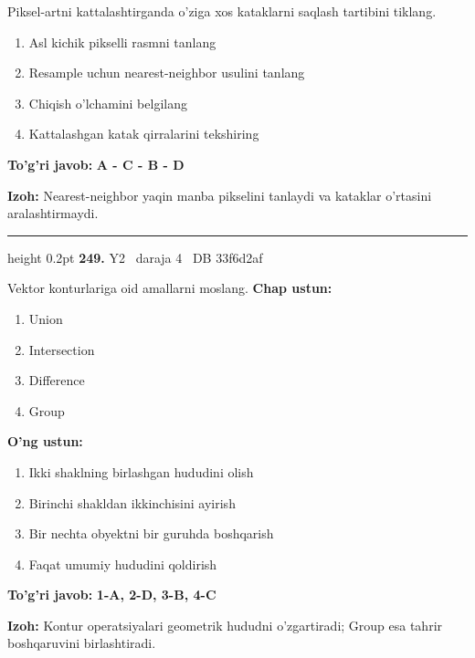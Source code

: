 \documentclass[10pt,a4paper,oneside]{article}
\begin{document}
Piksel-artni kattalashtirganda o'ziga xos kataklarni saqlash tartibini tiklang.
\begin{enumerate}[label=\Alph*),leftmargin=9mm]
\item Asl kichik pikselli rasmni tanlang
\item Resample uchun nearest-neighbor usulini tanlang
\item Chiqish o'lchamini belgilang
\item Kattalashgan katak qirralarini tekshiring
\end{enumerate}
\begin{tcolorbox}[enhanced,breakable,colback=teal!4,colframe=teal!45!black,boxrule=0.45pt,arc=1.2mm,left=2.8mm,right=2.8mm,top=2mm,bottom=2mm,before skip=2mm,after skip=2mm]
\textbf{\color{teal}To'g'ri javob:} \textbf{A - C - B - D}
\par\smallskip
\textbf{Izoh:} Nearest-neighbor yaqin manba pikselini tanlaydi va kataklar o'rtasini aralashtirmaydi.
\end{tcolorbox}
\vspace{2mm}\hrule height 0.2pt \vspace{4mm}
\hypertarget{q249}{\textbf{\color{ink}249.}}  {\color{muted}\scriptsize Y2 \textbullet\ daraja 4 \textbullet\ DB 33f6d2af}
\par
Vektor konturlariga oid amallarni moslang.
\textbf{\footnotesize Chap ustun:}
\begin{enumerate}[label=\arabic*),leftmargin=9mm]
\item Union
\item Intersection
\item Difference
\item Group
\end{enumerate}
\textbf{\footnotesize O'ng ustun:}
\begin{enumerate}[label=\Alph*),leftmargin=9mm]
\item Ikki shaklning birlashgan hududini olish
\item Birinchi shakldan ikkinchisini ayirish
\item Bir nechta obyektni bir guruhda boshqarish
\item Faqat umumiy hududini qoldirish
\end{enumerate}
\begin{tcolorbox}[enhanced,breakable,colback=teal!4,colframe=teal!45!black,boxrule=0.45pt,arc=1.2mm,left=2.8mm,right=2.8mm,top=2mm,bottom=2mm,before skip=2mm,after skip=2mm]
\textbf{\color{teal}To'g'ri javob:} \textbf{1-A, 2-D, 3-B, 4-C}
\par\smallskip
\textbf{Izoh:} Kontur operatsiyalari geometrik hududni o'zgartiradi; Group esa tahrir boshqaruvini birlashtiradi.
\end{tcolorbox}
\end{document}
